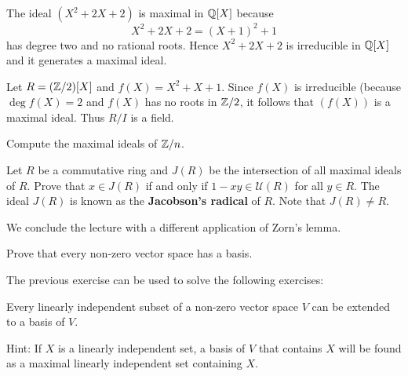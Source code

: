 
\begin{example}
	The ideal $(X^2+2X+2)$ is maximal in $\mathbb{Q}[X]$ because
	\[
	X^2+2X+2=(X+1)^2+1
	\]
	has degree two and no rational roots. 
	Hence $X^2+2X+2$ is irreducible in $\mathbb{Q}[X]$ and it generates 
	a maximal ideal. 	
\end{example}


\begin{example}
	Let $R=(\mathbb{Z}/2)[X]$ and $f(X)=X^2+X+1$. Since $f(X)$ is irreducible (because $\deg f(X)=2$ and
	$f(X)$ has no roots in $\mathbb{Z}/2$, it follows that $(f(X))$ is a maximal ideal. 
	Thus $R/I$ is a field. 
\end{example}

\begin{exercise}
	Compute the maximal ideals of $\mathbb{Z}/n$. 	
\end{exercise}

\begin{exercise}
\label{xca:Jacobson}
	Let $R$ be a commutative ring and $J(R)$ be the intersection of all maximal ideals 
	of $R$. Prove that $x\in J(R)$ 
	if and only if $1-xy\in\mathcal{U}(R)$ for all $y\in R$. The ideal $J(R)$ is known
	as the \textbf{Jacobson's radical} of $R$. Note that $J(R)\ne R$.   
\end{exercise}

We conclude the lecture with a different application of Zorn's lemma.  

\begin{exercise}
	Prove that every non-zero vector space has a basis.
\end{exercise}

The previous exercise can be used to solve the following exercises:

\begin{exercise}
\label{xca:extend}
    Every linearly independent subset of a non-zero vector space
    $V$ can be extended to a basis of $V$.
\end{exercise} 

Hint: If $X$ is a linearly independent set, a basis 
of $V$ that contains $X$ will be found as a maximal linearly independent set 
containing $X$. 

